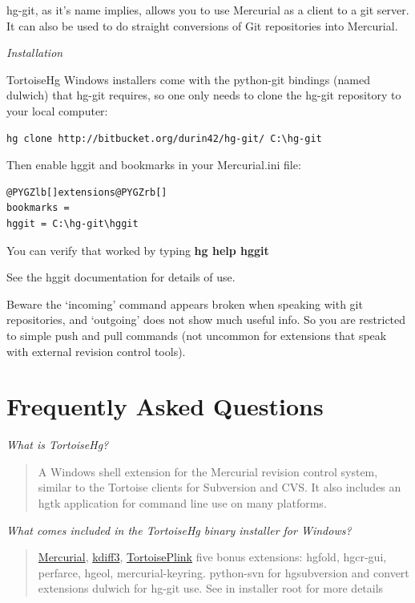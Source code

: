 \documentclass[letterpaper,10pt,english]{manual}
\begin{document}
hg-git, as it's name implies, allows you to use Mercurial as a
client to a git server.  It can also be used to do straight conversions
of Git repositories into Mercurial.

\emph{Installation}

TortoiseHg Windows installers come with the python-git bindings (named
dulwich) that hg-git requires, so one only needs to clone the
hg-git repository to your local computer:

\begin{Verbatim}[commandchars=@\[\]]
hg clone http://bitbucket.org/durin42/hg-git/ C:\hg-git
\end{Verbatim}

Then enable hggit and bookmarks in your Mercurial.ini file:

\begin{Verbatim}[commandchars=@\[\]]
@PYGZlb[]extensions@PYGZrb[]
bookmarks =
hggit = C:\hg-git\hggit
\end{Verbatim}

You can verify that worked by typing \textbf{hg help hggit}

See the hggit documentation for details of use.

Beware the `incoming' command appears broken when speaking with git
repositories, and `outgoing' does not show much useful info. So you are
restricted to simple push and pull commands (not uncommon for extensions
that speak with external revision control tools).

\resetcurrentobjects
\hypertarget{--doc-faq}{}

\chapter{Frequently Asked Questions}

\emph{What is TortoiseHg?}
\begin{quote}

A Windows shell extension for the Mercurial revision control system,
similar to the Tortoise clients for Subversion and CVS. It also
includes an hgtk application for command line use on many platforms.
\end{quote}

\emph{What comes included in the TortoiseHg binary installer for Windows?}
\begin{quote}

\href{http://mercurial.selenic.com/wiki/}{Mercurial},
\href{http://kdiff3.sourceforge.net/}{kdiff3},
\href{http://www.chiark.greenend.org.uk/\%7Esgtatham/putty/}{TortoisePlink}
five bonus extensions: hgfold, hgcr-gui, perfarce, hgeol, mercurial-keyring.
python-svn for hgsubversion and convert extensions
dulwich for hg-git use.
See  in installer root for more details
\end{quote}
\end{document}
